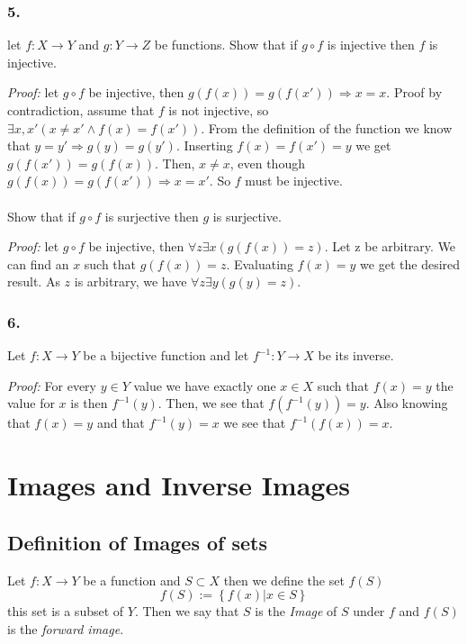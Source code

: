 \subsubsection*{5.}
let $f:X\rightarrow Y$ and $g:Y\rightarrow Z$ be functions. Show that if $g\circ f$ is injective then $f$ is injective.

\textit{Proof: } let $g\circ f$ be injective, then $g(f(x)) = g(f(x')) \Rightarrow x = x$. Proof by contradiction, assume that $f$ is not injective, so $\exists x,x' \left( x\neq x' \wedge f(x) = f(x')\right)$. From the definition of the function we know that $y = y' \Rightarrow g(y) = g(y')$. Inserting $f(x) = f(x') = y$ we get $g(f(x')) = g(f(x))$. Then, $x \neq x$, even though $g(f(x)) = g(f(x')) \Rightarrow x = x'$. So $f$ must be injective.\\\\
Show that if $g\circ f$ is surjective then $g$ is surjective.

\textit{Proof: }let $g\circ f$ be injective, then $\forall z\exists x(g(f(x)) = z)$. Let z be arbitrary. We can find an $x$ such that $g(f(x)) = z$. Evaluating $f(x) = y$ we get the desired result. As $z$ is arbitrary, we have $\forall z\exists y (g(y) = z)$.

\subsubsection*{6.}
Let $f:X\rightarrow Y$ be a bijective function and let $f^{-1}:Y\rightarrow X$ be its inverse.

\textit{Proof: } For every $y\in Y$ value we have exactly one $x\in X$ such that $f(x) = y$ the value for $x$ is then $f^{-1}(y)$. Then, we see that $f(f^{-1}(y)) = y$. Also knowing that $f(x) = y$ and that $f^{-1}(y) = x$ we see that $f^{-1}(f(x)) = x$.

\subsubsection*{}

\subsubsection*{}

\section{Images and Inverse Images}

\subsection{Definition of Images of sets}
Let $f:X\rightarrow Y$ be a function and $S\subset X$ then we define the set $f(S)$
$$
f(S) := \left\{f(x) | x\in S\right\}
$$
this set is a subset of $Y$. Then we say that $S$ is the \textit{Image} of $S$ under $f$ and $f(S)$ is the \textit{forward image}.

